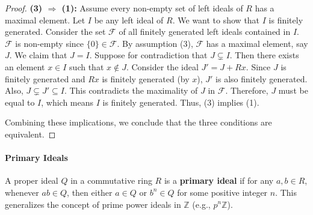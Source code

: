 \documentclass[12pt]{article}
\theoremstyle{definition}
\numberwithin{equation}{subsection}
\begin{document}
\begin{proof}
\textbf{(3) $\Rightarrow$ (1):} Assume every non-empty set of left ideals of $R$ has a maximal element. Let $I$ be any left ideal of $R$. We want to show that $I$ is finitely generated. Consider the set $\mathcal{F}$ of all finitely generated left ideals contained in $I$. $\mathcal{F}$ is non-empty since $\{0\} \in \mathcal{F}$. By assumption (3), $\mathcal{F}$ has a maximal element, say $J$. We claim that $J=I$. Suppose for contradiction that $J \subsetneq I$. Then there exists an element $x \in I$ such that $x \notin J$. Consider the ideal $J' = J + Rx$. Since $J$ is finitely generated and $Rx$ is finitely generated (by $x$), $J'$ is also finitely generated. Also, $J \subsetneq J' \subseteq I$. This contradicts the maximality of $J$ in $\mathcal{F}$. Therefore, $J$ must be equal to $I$, which means $I$ is finitely generated. Thus, (3) implies (1).

Combining these implications, we conclude that the three conditions are equivalent.
\end{proof}

\paragraph{Primary Ideals}
A proper ideal $Q$ in a commutative ring $R$ is a \textbf{primary ideal} if for any $a,b \in R$, whenever $ab \in Q$, then either $a \in Q$ or $b^n \in Q$ for some positive integer $n$. This generalizes the concept of prime power ideals in $\mathbb{Z}$ (e.g., $p^n\mathbb{Z}$).
\end{document}

